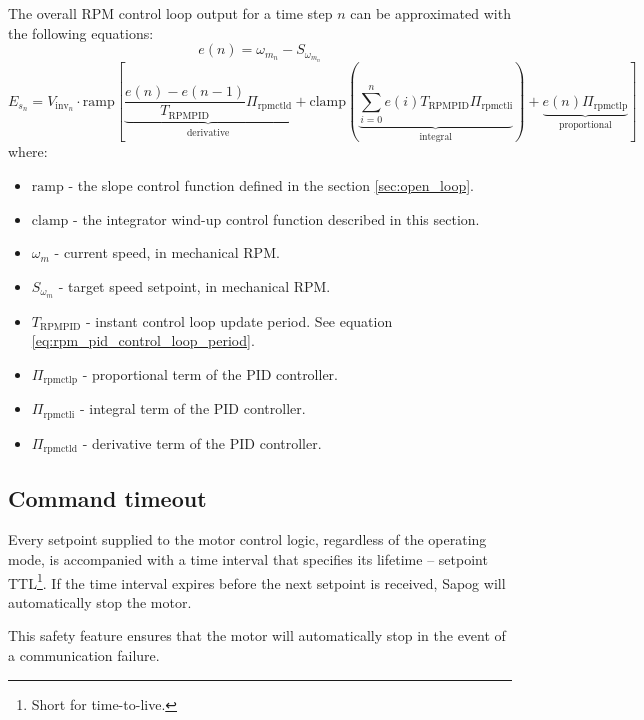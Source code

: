 \documentclass{zubaxdoc}
\begin{document}
The overall RPM control loop output for a time step $n$ can be approximated with the following equations:
\begin{equation}
e(n) = \omega_{m_{n}} - S_{\omega_{m_{n}}}
\end{equation}
\begin{equation}
E_{s_n} = V_{\text{inv}_n}\cdot\mathrm{ramp}
\left[
\underbrace{\frac{e\left(n\right) - e\left(n-1\right)}{T_{\text{RPMPID}}} \Pi_{\text{rpmctld}}}_\text{derivative} +
\mathrm{clamp}\left(
\underbrace{\sum_{i=0}^n e\left(i\right) T_{\text{RPMPID}} \Pi_{\text{rpmctli}}}_\text{integral}
\right) +
\underbrace{e\left(n\right) \Pi_{\text{rpmctlp}}}_\text{proportional}
\right]
\end{equation}
where:
\begin{itemize}
\item $\mathrm{ramp}$ - the slope control function defined in the section \ref{sec:open_loop}.
\item $\mathrm{clamp}$ - the integrator wind-up control function described in this section.
\item $\omega_{m}$ - current speed, in mechanical RPM.
\item $S_{\omega_{m}}$ - target speed setpoint, in mechanical RPM.
\item $T_{\text{RPMPID}}$ - instant control loop update period.
See equation \ref{eq:rpm_pid_control_loop_period}.
\item $\Pi_{\text{rpmctlp}}$ - proportional term of the PID controller.
\item $\Pi_{\text{rpmctli}}$ - integral term of the PID controller.
\item $\Pi_{\text{rpmctld}}$ - derivative term of the PID controller.
\end{itemize}

\subsection{Command timeout}\label{sec:setpoint_ttl}

Every setpoint supplied to the motor control logic, regardless of the operating mode, is
accompanied with a time interval that specifies its lifetime -- setpoint TTL\footnote{Short for time-to-live.}.
If the time interval expires before the next setpoint is received, Sapog will automatically
stop the motor.

This safety feature ensures that the motor will automatically stop in the event of a communication failure.
\end{document}
